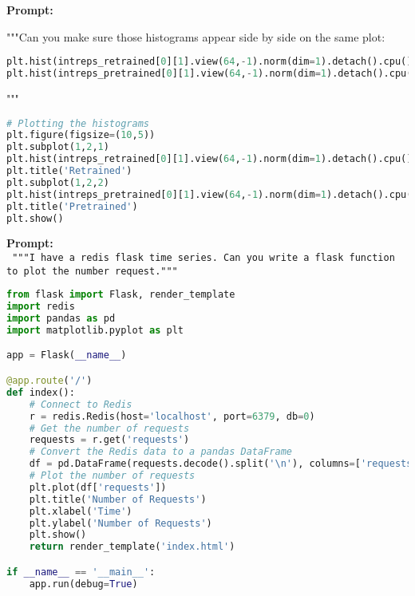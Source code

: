 \begin{AIbox}{}
\textbf{\color{purple}Prompt:}\\ \tt{\color{purple}\footnotesize """Can you make sure those histograms appear side by side on the same plot:
\begin{lstlisting}[language=Python, style=mystyle]
plt.hist(intreps_retrained[0][1].view(64,-1).norm(dim=1).detach().cpu().numpy(), bins = 20)
plt.hist(intreps_pretrained[0][1].view(64,-1).norm(dim=1).detach().cpu().numpy(), bins = 20)
\end{lstlisting}"""}

\vspace{-5pt}
\begin{minipage}[t]{0.99\linewidth}
\begin{lstlisting}[language=Python, style=mystyle]
# Plotting the histograms
plt.figure(figsize=(10,5))
plt.subplot(1,2,1)
plt.hist(intreps_retrained[0][1].view(64,-1).norm(dim=1).detach().cpu().numpy(), bins = 20)
plt.title('Retrained')
plt.subplot(1,2,2)
plt.hist(intreps_pretrained[0][1].view(64,-1).norm(dim=1).detach().cpu().numpy(), bins = 20)
plt.title('Pretrained')
plt.show()
\end{lstlisting}
\end{minipage}
\end{AIbox}

\begin{AIbox}{}
\textbf{\color{purple}Prompt:}\\ \tt{\color{purple}\footnotesize 
"""I have a redis flask time series. Can you write a flask function to plot the number request."""
}

\vspace{-5pt}
\begin{minipage}[t]{0.99\linewidth}
\begin{lstlisting}[language=Python, style=mystyle]
from flask import Flask, render_template
import redis
import pandas as pd
import matplotlib.pyplot as plt

app = Flask(__name__)

@app.route('/')
def index():
    # Connect to Redis
    r = redis.Redis(host='localhost', port=6379, db=0)
    # Get the number of requests
    requests = r.get('requests')
    # Convert the Redis data to a pandas DataFrame
    df = pd.DataFrame(requests.decode().split('\n'), columns=['requests'])
    # Plot the number of requests
    plt.plot(df['requests'])
    plt.title('Number of Requests')
    plt.xlabel('Time')
    plt.ylabel('Number of Requests')
    plt.show()
    return render_template('index.html')

if __name__ == '__main__':
    app.run(debug=True)
    \end{lstlisting}
\end{minipage}
\end{AIbox}

